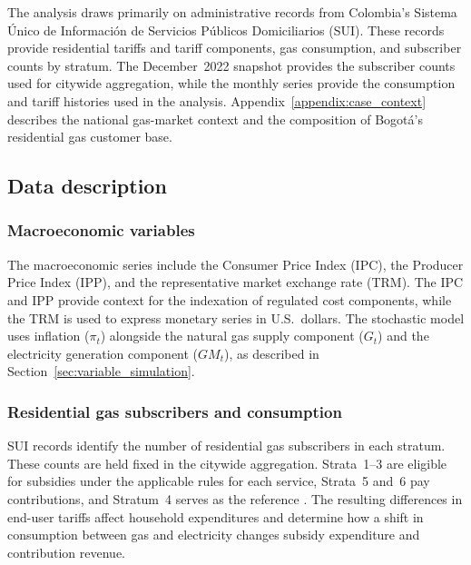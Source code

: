 \documentclass[authoryear,preprint,review,10pt]{elsarticle}
\begin{document}
The analysis draws primarily on administrative records from Colombia's Sistema Único de Información de Servicios Públicos Domiciliarios (SUI). These records provide residential tariffs and tariff components, gas consumption, and subscriber counts by stratum. The December~2022 snapshot provides the subscriber counts used for citywide aggregation, while the monthly series provide the consumption and tariff histories used in the analysis. Appendix~\ref{appendix:case_context} describes the national gas-market context and the composition of Bogotá's residential gas customer base.

\subsection{Data description}
\subsubsection{Macroeconomic variables}

The macroeconomic series include the Consumer Price Index (IPC), the Producer Price Index (IPP), and the representative market exchange rate (TRM). The IPC and IPP provide context for the indexation of regulated cost components, while the TRM is used to express monetary series in U.S.\ dollars. The stochastic model uses inflation ($\pi_t$) alongside the natural gas supply component ($G_t$) and the electricity generation component ($GM_t$), as described in Section~\ref{sec:variable_simulation}.

\subsubsection{Residential gas subscribers and consumption}

SUI records identify the number of residential gas subscribers in each stratum. These counts are held fixed in the citywide aggregation. Strata~1--3 are eligible for subsidies under the applicable rules for each service, Strata~5 and~6 pay contributions, and Stratum~4 serves as the reference \citep{CREG137_2013,CREG184_2014,cabrales2023costos}. The resulting differences in end-user tariffs affect household expenditures and determine how a shift in consumption between gas and electricity changes subsidy expenditure and contribution revenue.
\end{document}

